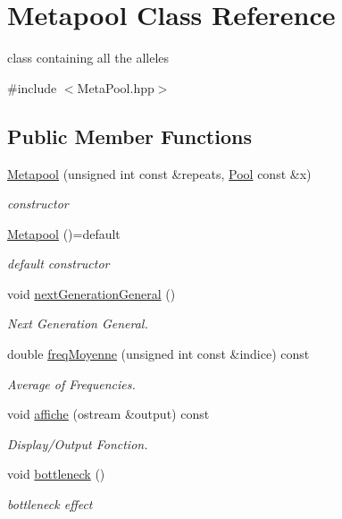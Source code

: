 \hypertarget{class_metapool}{}\section{Metapool Class Reference}
\label{class_metapool}


class containing all the alleles  




{\ttfamily \#include $<$Meta\+Pool.\+hpp$>$}

\subsection*{Public Member Functions}
\begin{DoxyCompactItemize}
\item 
\hyperlink{class_metapool_a40f55ee361d80463bb5f8afac39000d9}{Metapool} (unsigned int const \&repeats, \hyperlink{class_pool}{Pool} const \&x)
\begin{DoxyCompactList}\small\item\em constructor \end{DoxyCompactList}\item 
\hyperlink{class_metapool_a727b9683d9b15b0d07a0a83ce25bbdcd}{Metapool} ()=default
\begin{DoxyCompactList}\small\item\em default constructor \end{DoxyCompactList}\item 
void \hyperlink{class_metapool_aff52cdb3a0fbdca26b966213aaf3577b}{next\+Generation\+General} ()
\begin{DoxyCompactList}\small\item\em Next Generation General. \end{DoxyCompactList}\item 
double \hyperlink{class_metapool_af391e0b9374cd19ec027437a4aa83d7f}{freq\+Moyenne} (unsigned int const \&indice) const
\begin{DoxyCompactList}\small\item\em Average of Frequencies. \end{DoxyCompactList}\item 
void \hyperlink{class_metapool_a057829fc0c87436e1d7d5c4e14d7ef4f}{affiche} (ostream \&output) const
\begin{DoxyCompactList}\small\item\em Display/\+Output Fonction. \end{DoxyCompactList}\item 
void \hyperlink{class_metapool_a54acb827f5913283577c5e1830f3bf2e}{bottleneck} ()
\begin{DoxyCompactList}\small\item\em bottleneck effect \end{DoxyCompactList}\end{DoxyCompactItemize}


